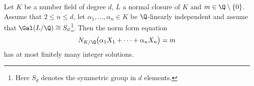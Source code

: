 \begin{thm}[Schmidt, 1970s] \label{thm:5.19}
	Let \( K \) be a number field of degree \( d \), \( L \) a normal closure of \( K \) and \( m \in \Q \setminus \{0\} \).
	Assume that \( 2 \leq n \leq d \), let \( \alpha_1, \dotsc, \alpha_n \in K \) be \( \Q \)-linearly independent and assume that \( \Gal(L/\Q) \cong S_d \)\footnote{Here \( S_d \) denotes the symmetric group in \( d \) elements.}.
	Then the norm form equation 
	\[ N_{K/\Q} \big(\alpha_1 X_1 + \dots + \alpha_n X_n\big) = m \]
	has at most finitely many integer solutions.
\end{thm}